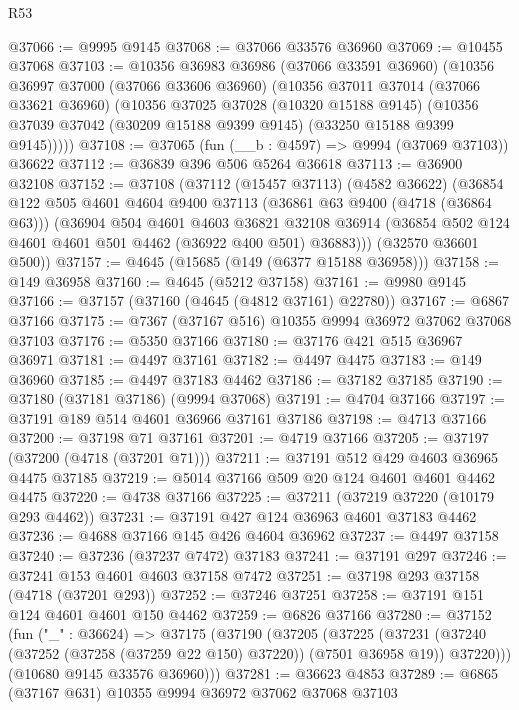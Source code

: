 \begin{lexlean}{R53}
\begin{coremodule}
@37066 := @9995 @9145
@37068 := @37066 @33576 @36960
@37069 := @10455 @37068
@37103 := @10356
    @36983
    @36986
    (@37066 @33591 @36960)
    (@10356
      @36997
      @37000
      (@37066 @33606 @36960)
      (@10356
        @37011
        @37014
        (@37066 @33621 @36960)
        (@10356
          @37025
          @37028
          (@10320 @15188 @9145)
          (@10356 @37039 @37042 (@30209 @15188 @9399 @9145) (@33250 @15188 @9399 @9145)))))
@37108 := @37065 (fun (__b : @4597) => @9994 (@37069 @37103)) @36622
@37112 := @36839 @396 @506 @5264 @36618
@37113 := @36900 @32108
@37152 := @37108
    (@37112
      (@15457 @37113)
      (@4582 @36622)
      (@36854
        @122
        @505
        @4601
        @4604
        @9400
        @37113
        (@36861 @63 @9400 (@4718 (@36864 @63)))
        (@36904
          @504
          @4601
          @4603
          @36821
          @32108
          @36914
          (@36854 @502 @124 @4601 @4601 @501 @4462 (@36922 @400 @501) @36883)))
      (@32570 @36601 @500))
@37157 := @4645 (@15685 (@149 (@6377 @15188 @36958)))
@37158 := @149 @36958
@37160 := @4645 (@5212 @37158)
@37161 := @9980 @9145
@37166 := @37157 (@37160 (@4645 (@4812 @37161) @22780))
@37167 := @6867 @37166
@37175 := @7367 (@37167 @516) @10355 @9994 @36972 @37062 @37068 @37103
@37176 := @5350 @37166
@37180 := @37176 @421 @515 @36967 @36971
@37181 := @4497 @37161
@37182 := @4497 @4475
@37183 := @149 @36960
@37185 := @4497 @37183 @4462
@37186 := @37182 @37185
@37190 := @37180 (@37181 @37186) (@9994 @37068)
@37191 := @4704 @37166
@37197 := @37191 @189 @514 @4601 @36966 @37161 @37186
@37198 := @4713 @37166
@37200 := @37198 @71 @37161
@37201 := @4719 @37166
@37205 := @37197 (@37200 (@4718 (@37201 @71)))
@37211 := @37191 @512 @429 @4603 @36965 @4475 @37185
@37219 := @5014 @37166 @509 @20 @124 @4601 @4601 @4462 @4475
@37220 := @4738 @37166
@37225 := @37211 (@37219 @37220 (@10179 @293 @4462))
@37231 := @37191 @427 @124 @36963 @4601 @37183 @4462
@37236 := @4688 @37166 @145 @426 @4604 @36962
@37237 := @4497 @37158
@37240 := @37236 (@37237 @7472) @37183
@37241 := @37191 @297
@37246 := @37241 @153 @4601 @4603 @37158 @7472
@37251 := @37198 @293 @37158 (@4718 (@37201 @293))
@37252 := @37246 @37251
@37258 := @37191 @151 @124 @4601 @4601 @150 @4462
@37259 := @6826 @37166
@37280 := @37152
    (fun ("_" : @36624) =>
    @37175
      (@37190
        (@37205
          (@37225
            (@37231 (@37240 (@37252 (@37258 (@37259 @22 @150) @37220)) (@7501 @36958 @19)) @37220)))
        (@10680 @9145 @33576 @36960)))
@37281 := @36623 @4853
@37289 := @6865 (@37167 @631) @10355 @9994 @36972 @37062 @37068 @37103

\end{coremodule}
\end{lexlean}
